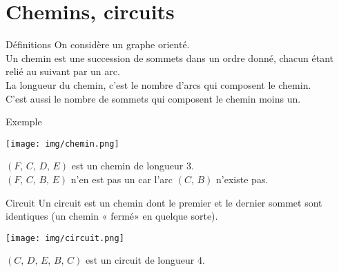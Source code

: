 \documentclass[10pt]{beamer}
\begin{document}
\section*{Chemins, circuits}
\begin{frame}{Définitions}
On considère un graphe orienté.\\

Un \alert{chemin} est une succession de sommets dans un ordre donné, chacun étant relié au suivant par un arc.\\

La \alert{longueur} du chemin, c'est le nombre d'arcs qui composent le chemin.\\
C'est aussi le nombre de sommets qui composent le chemin moins un.
\end{frame}
\begin{frame}{Exemple}
\begin{center}
\texttt{[image: img/chemin.png]}
\end{center}
$(F,\,C,\,D,\,E)$ est un chemin de longueur 3.\\

$(F,\,C,\,B,\,E)$ n'en est pas un car l'arc $(C,\,B)$ n'existe pas. 
\end{frame}
\begin{frame}{Circuit}
Un \alert{circuit} est un chemin dont le premier et le dernier sommet sont identiques (un chemin « fermé» en quelque sorte).
\begin{center}
\texttt{[image: img/circuit.png]}
\end{center}
$(C,\,D,\,E,\,B,\,C)$ est un circuit de longueur 4.
\end{frame}
\end{document}
